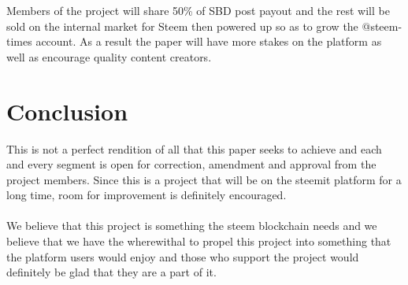 \documentclass[a4paper,12pt]{article}
\newcommand{\sectionbreak}{\clearpage}
\begin{document}
\noindent
Members of the project will share 50\% of SBD post payout and the rest will be sold on the internal market for Steem then powered up so as to grow the @steem-times account.  As a result the paper will have more stakes on the platform as well as encourage quality content creators.

\sectionbreak   

\section{Conclusion}

This is not a perfect rendition of all that this paper seeks to achieve and each and every segment is open for correction, amendment and approval from the project members. Since this is a project that will be on the steemit platform for a long time, room for improvement is definitely encouraged. 
\\\\
We believe that this project is something the steem blockchain needs and we believe that we have the wherewithal to propel this project into something that the platform users would enjoy and those who support the project would definitely be glad that they are a part of it. 

\end{document}
